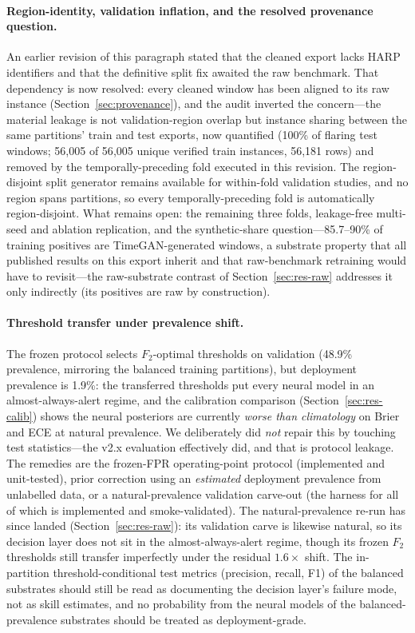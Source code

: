 \paragraph{Region-identity, validation inflation, and the resolved
provenance question.}
An earlier revision of this paragraph stated that the cleaned export lacks
HARP identifiers and that the definitive split fix awaited the raw
benchmark. That dependency is now resolved: every cleaned window has
been aligned to its raw instance (Section~\ref{sec:provenance}), and
the audit inverted the concern---the material leakage is not
validation-region overlap but instance sharing between the same
partitions' train and test exports, now quantified (100\% of flaring
test windows; 56{,}005 of 56{,}005 unique verified train instances,
56{,}181 rows) and
removed by the temporally-preceding fold executed in this revision.
The region-disjoint split generator remains available for
within-fold validation studies, and no region spans partitions, so
every temporally-preceding fold is automatically region-disjoint.
What remains open: the remaining three folds, leakage-free multi-seed
and ablation replication, and the synthetic-share question---85.7--90\%
of training positives are TimeGAN-generated windows, a substrate
property that all published results on this export inherit and that
raw-benchmark retraining would have to revisit---the raw-substrate
contrast of Section~\ref{sec:res-raw} addresses it only indirectly
(its positives are raw by construction).

\paragraph{Threshold transfer under prevalence shift.}
The frozen protocol selects $F_2$-optimal thresholds on validation
(48.9\% prevalence, mirroring the balanced training partitions), but
deployment prevalence is 1.9\%: the transferred thresholds put every
neural model in an almost-always-alert regime, and the calibration
comparison (Section~\ref{sec:res-calib}) shows the neural posteriors
are currently \emph{worse than climatology} on Brier and ECE at
natural prevalence. We deliberately did \emph{not} repair this by
touching test statistics---the v2.x evaluation effectively did, and
that is protocol leakage. The remedies are the frozen-FPR
operating-point protocol (implemented and unit-tested), prior
correction using an \emph{estimated} deployment prevalence from
unlabelled data, or a natural-prevalence validation carve-out (the
harness for all of which is implemented and smoke-validated). The
natural-prevalence re-run has since landed
(Section~\ref{sec:res-raw}): its validation carve is likewise
natural, so its decision layer does not sit in the almost-always-alert
regime, though its frozen $F_2$ thresholds still transfer imperfectly
under the residual $1.6\times$ shift. The in-partition
threshold-conditional test metrics (precision, recall, F1) of the
balanced substrates should still be read as documenting the
decision layer's failure mode, not as skill estimates, and no
probability from the neural models of the balanced-prevalence
substrates should be treated as
deployment-grade.

